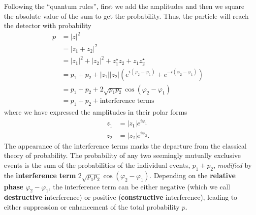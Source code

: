 \documentclass[fleqn]{article}
\begin{document}
Following the ``quantum rules'', first we add the amplitudes and then we square the absolute value of the sum to get the probability.
Thus, the particle will reach the detector with probability
\[
  \begin{aligned}
    p &= |z|^2
  \\& = |z_1 + z_2|^2
  \\& = |z_1|^2 + |z_2|^2
        + z_1^\star z_2 + z_1 z_2^\star
  \\& = p_1 + p_2
        + |z_1||z_2|\left(
          e^{i(\varphi_2-\varphi_1)}
          + e^{-i(\varphi_2-\varphi_1)}
        \right)
  \\& = p_1 + p_2
        + 2 \sqrt{p_1 p_2} \cos(\varphi_2-\varphi_1)
  \\& = p_1 + p_2 + \text{interference terms}
  \end{aligned}
\tag{1.2.1.1}
\]
where we have expressed the amplitudes in their polar forms
\[
\begin{aligned}
  z_1 &= |z_1|e^{i\varphi_1}
\\z_2 &= |z_2|e^{i\varphi_2}.
\end{aligned}
\]
The appearance of the interference terms marks the departure from the classical theory of probability.
The probability of any two seemingly mutually exclusive events is the sum of the probabilities of the individual events, \(p_1 + p_2\), \emph{modified} by the \textbf{interference term} \(2 \sqrt{p_1p_2}\cos(\varphi_2-\varphi_1)\).
Depending on the \textbf{relative phase} \(\varphi_2-\varphi_1\), the interference term can be either negative (which we call \textbf{destructive} interference) or positive (\textbf{constructive} interference), leading to either suppression or enhancement of the total probability \(p\).
\end{document}
